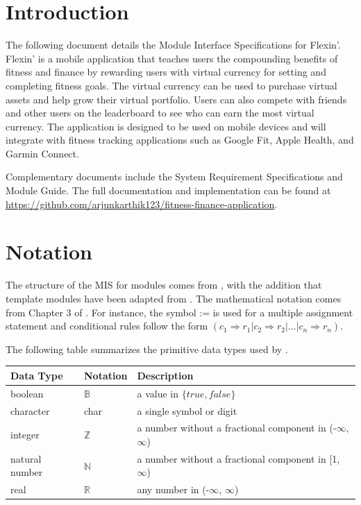 \documentclass[12pt, titlepage]{article}
\begin{document}
\tableofcontents


\section{Introduction}

The following document details the Module Interface Specifications for
Flexin'. Flexin' is a mobile application that teaches users the compounding benefits of fitness and finance by rewarding users with virtual currency for setting and completing fitness goals. The virtual currency can be used to purchase virtual assets and help grow their virtual portfolio. Users can also compete with friends and other users on the leaderboard to see who can earn the most virtual currency. The application is designed to be used on mobile devices and will integrate with fitness tracking applications such as Google Fit, Apple Health, and Garmin Connect.

Complementary documents include the System Requirement Specifications
and Module Guide.  The full documentation and implementation can be
found at \url{https://github.com/arjunkarthik123/fitness-finance-application}.

\section{Notation}

The structure of the MIS for modules comes from \citet{HoffmanAndStrooper1995},
with the addition that template modules have been adapted from
\cite{GhezziEtAl2003}.  The mathematical notation comes from Chapter 3 of
\citet{HoffmanAndStrooper1995}.  For instance, the symbol := is used for a
multiple assignment statement and conditional rules follow the form $(c_1
\Rightarrow r_1 | c_2 \Rightarrow r_2 | ... | c_n \Rightarrow r_n )$.

The following table summarizes the primitive data types used by \progname. 

\begin{center}
\renewcommand{\arraystretch}{1.2}
\noindent 
\begin{tabular}{l l p{7.5cm}} 
\toprule 
\textbf{Data Type} & \textbf{Notation} & \textbf{Description}\\ 
\midrule
boolean & $\mathbb{B}$ & a value in $\{\mathit{true}, \mathit{false}\}$\\
character & char & a single symbol or digit\\
integer & $\mathbb{Z}$ & a number without a fractional component in (-$\infty$, $\infty$) \\
natural number & $\mathbb{N}$ & a number without a fractional component in [1, $\infty$) \\
real & $\mathbb{R}$ & any number in (-$\infty$, $\infty$)\\
\bottomrule
\end{tabular} 
\end{center}
\end{document}
